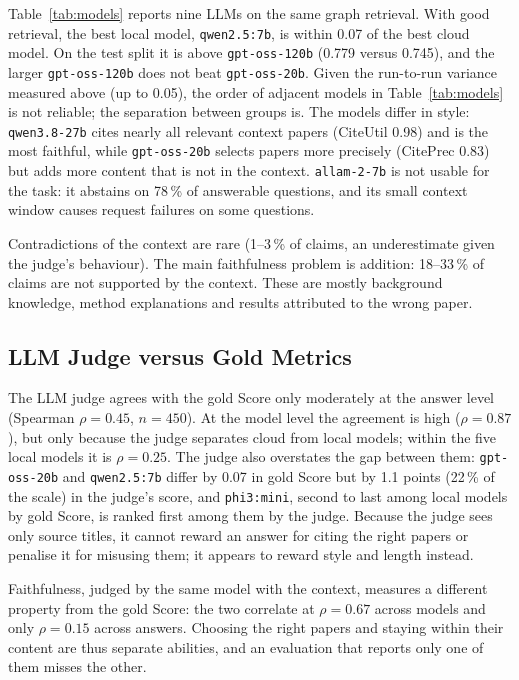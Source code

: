 Table~\ref{tab:models} reports nine LLMs on the same graph retrieval. With good
retrieval, the best local model, \texttt{qwen2.5:7b}, is within 0.07 of the best
cloud model. On the test split it is above \texttt{gpt-oss-120b} (0.779 versus
0.745), and the larger \texttt{gpt-oss-120b} does not beat \texttt{gpt-oss-20b}.
Given the run-to-run variance measured above (up to 0.05), the order of adjacent
models in Table~\ref{tab:models} is not reliable; the separation between groups
is. The models differ in style: \texttt{qwen3.8-27b} cites nearly all relevant
context papers (CiteUtil 0.98) and is the most faithful, while
\texttt{gpt-oss-20b} selects papers more precisely (CitePrec 0.83) but adds
more content that is not in the context. \texttt{allam-2-7b} is not usable for
the task: it abstains on 78\,\% of answerable questions, and its small context
window causes request failures on some questions.

Contradictions of the context are rare (1--3\,\% of claims, an underestimate
given the judge's behaviour). The main faithfulness problem is addition:
18--33\,\% of claims are not supported by the context. These are mostly
background knowledge, method explanations and results attributed to the wrong
paper.

\subsection{LLM Judge versus Gold Metrics}

The LLM judge agrees with the gold Score only moderately at the answer level
(Spearman $\rho = 0.45$, $n = 450$). At the model level the agreement is high
($\rho = 0.87$), but only because the judge separates cloud from local models;
within the five local models it is $\rho = 0.25$. The judge also overstates the
gap between them: \texttt{gpt-oss-20b} and \texttt{qwen2.5:7b} differ by 0.07 in
gold Score but by 1.1 points (22\,\% of the scale) in the judge's score, and
\texttt{phi3:mini}, second to last among local models by gold Score, is ranked
first among them by the judge. Because the judge sees only source titles, it
cannot reward an answer for citing the right papers or penalise it for
misusing them; it appears to reward style and length instead.

Faithfulness, judged by the same model with the context, measures a
different property from the gold Score: the two correlate at $\rho = 0.67$
across models and only $\rho = 0.15$ across answers. Choosing the right papers
and staying within their content are thus separate abilities, and an
evaluation that reports only one of them misses the other.
